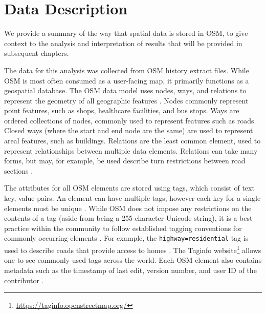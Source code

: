\chapter{Data Description}
\label{chapterlabel3}
We provide a summary of the way that spatial data is stored in OSM, to give context to the analysis and interpretation of results that will be provided in subsequent chapters.

The data for this analysis was collected from OSM history extract files. While OSM is most often consumed as a user-facing map, it primarily functions as a geospatial database. The OSM data model uses nodes, ways, and relations to represent the geometry of all geographic features \parencite{noauthor_elements_2020}. Nodes commonly represent point features, such as shops, healthcare facilities, and bus stops. Ways are ordered collections of nodes, commonly used to represent features such as roads. Closed ways (where the start and end node are the same) are used to represent areal features, such as buildings. Relations are the least common element, used to represent relationships between multiple data elements. Relations can take many forms, but may, for example, be used describe turn restrictions between road sections \parencite{noauthor_elements_2020}. 

The attributes for all OSM elements are stored using tags, which consist of text key, value pairs. An element can have multiple tags, however each key for a single elements must be unique \parencite{noauthor_tags_2020}. While OSM does not impose any restrictions on the contents of a tag (aside from being a 255-character Unicode string), it is a best-practice within the community to follow established tagging conventions for commonly occurring elements \parencite{noauthor_tags_2020}. For example, the \texttt{highway=residential} tag is used to describe roads that provide access to homes \parencite{noauthor_elements_2020}. The Taginfo website\footnote{\url{https://taginfo.openstreetmap.org/}} allows one to see commonly used tags across the world. Each OSM element also contains metadata such as the timestamp of last edit, version number, and user ID of the contributor \parencite{noauthor_elements_2020}. 

